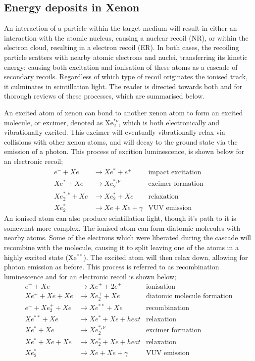 \subsection{Energy deposits in Xenon}
\par
An interaction of a particle within the target medium will result in either an interaction with the atomic nucleus, causing a nuclear recoil (NR), or within the electron cloud, resulting in a electron recoil (ER).
In both cases, the recoiling particle scatters with nearby atomic electrons and nuclei, transferring its kinetic energy: causing both excitation and ionisation of these atoms as a cascade of secondary recoils.
Regardless of which type of recoil originates the ionised track, it culminates in scintillation light.
The reader is directed towards both \cite{xenon_physics_ref} and \cite{carldahl_thesis_ref} for thorough reviews of these processes, which are summarised below.
\par
An excited atom of xenon can bond to another xenon atom to form an excited molecule, or excimer, denoted as Xe$_2^{*\nu}$, which is both electronically and vibrationally excited.
This excimer will eventually vibrationally relax via collisions with other xenon atoms, and will decay to the ground state via the emission of a photon.
This process of excition luminescence, is shown below for an electronic recoil;
\begin{align*}
    e^- + Xe &\rightarrow Xe^* + e^+  &\text{impact excitation} \\ 
    Xe^* + Xe &\rightarrow Xe_2^{*,\nu} &\text{excimer formation} \\
    Xe_2^{*,\nu} + Xe &\rightarrow Xe_2^* + Xe &\text{relaxation} \\
    Xe_2^* &\rightarrow Xe + Xe + \gamma &\text{VUV emission} 
\end{align*}
An ionised atom can also produce scintillation light, though it's path to it is somewhat more complex.
The ionised atom can form diatomic molecules with nearby atoms.
Some of the electrons which were liberated during the cascade will recombine with the molecule, causing it to split leaving one of the atoms in a highly excited state (Xe$^{**}$).
The excited atom will then relax down, allowing for photon emission as before.
This process is referred to as recombination luminescence and for an electronic recoil is shown below;
\begin{align*}
    e^- + Xe &\rightarrow Xe^+ + 2e^+- &\text{ionisation} \\ 
    Xe^+ + Xe + Xe &\rightarrow Xe_2^{+} + Xe &\text{diatomic molecule formation} \\
    e^- + Xe_2^+ + Xe&\rightarrow Xe^{**} + Xe &\text{recombination} \\
    Xe^{**} + Xe &\rightarrow Xe^{*} + Xe + heat &\text{relaxation} \\
    Xe^{*} + Xe  &\rightarrow Xe_2^{*,\nu} &\text{excimer formation} \\
    Xe^{*} + Xe + Xe &\rightarrow Xe_2^{*} + Xe + heat &\text{relaxation} \\
    Xe_2^* &\rightarrow Xe + Xe + \gamma &\text{VUV emission} 
\end{align*}
